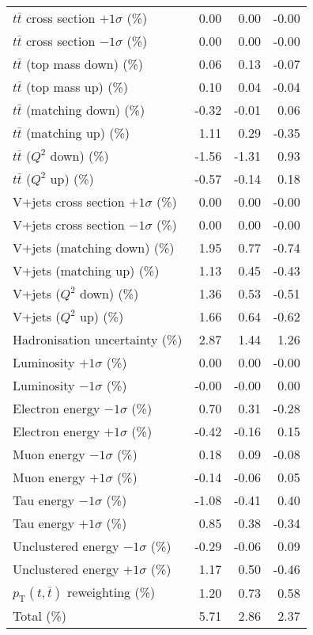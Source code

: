 \begin{table}[htbp]
{\begin{tabular}{lrrr}
$t\bar{t}$ cross section $+1\sigma$ (\%) & 0.00 & 0.00 & -0.00 \\ 
$t\bar{t}$ cross section $-1\sigma$ (\%) & 0.00 & 0.00 & -0.00 \\ 
$t\bar{t}$ (top mass down) (\%) & 0.06 & 0.13 & -0.07 \\ 
$t\bar{t}$ (top mass up) (\%) & 0.10 & 0.04 & -0.04 \\ 
$t\bar{t}$ (matching down) (\%) & -0.32 & -0.01 & 0.06 \\ 
$t\bar{t}$ (matching up) (\%) & 1.11 & 0.29 & -0.35 \\ 
$t\bar{t}$ ($Q^{2}$ down) (\%) & -1.56 & -1.31 & 0.93 \\ 
$t\bar{t}$ ($Q^{2}$ up) (\%) & -0.57 & -0.14 & 0.18 \\ 
V+jets cross section \ensuremath{+1\sigma} (\%) & 0.00 & 0.00 & -0.00 \\ 
V+jets cross section \ensuremath{-1\sigma} (\%) & 0.00 & 0.00 & -0.00 \\ 
V+jets (matching down) (\%) & 1.95 & 0.77 & -0.74 \\ 
V+jets (matching up) (\%) & 1.13 & 0.45 & -0.43 \\ 
V+jets ($Q^{2}$ down) (\%) & 1.36 & 0.53 & -0.51 \\ 
V+jets ($Q^{2}$ up) (\%) & 1.66 & 0.64 & -0.62 \\ 
Hadronisation uncertainty (\%) & 2.87 & 1.44 & 1.26 \\ 
Luminosity $+1\sigma$ (\%) & 0.00 & 0.00 & -0.00 \\ 
Luminosity $-1\sigma$ (\%) & -0.00 & -0.00 & 0.00 \\ 
Electron energy $-1\sigma$ (\%) & 0.70 & 0.31 & -0.28 \\ 
Electron energy $+1\sigma$ (\%) & -0.42 & -0.16 & 0.15 \\ 
Muon energy $-1\sigma$ (\%) & 0.18 & 0.09 & -0.08 \\ 
Muon energy $+1\sigma$ (\%) & -0.14 & -0.06 & 0.05 \\ 
Tau energy $-1\sigma$ (\%) & -1.08 & -0.41 & 0.40 \\ 
Tau energy $+1\sigma$ (\%) & 0.85 & 0.38 & -0.34 \\ 
Unclustered energy $-1\sigma$ (\%) & -0.29 & -0.06 & 0.09 \\ 
Unclustered energy $+1\sigma$ (\%) & 1.17 & 0.50 & -0.46 \\ 
$p_\mathrm{T}(t,\bar{t})$ reweighting (\%) & 1.20 & 0.73 & 0.58 \\ 
\hline 
Total (\%) & 5.71  & 2.86  & 2.37 \\ 
\hline 
\end{tabular}
}
\end{table}
